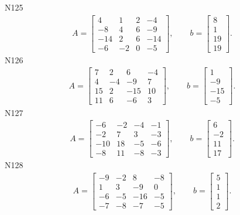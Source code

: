 \documentclass[11pt]{report}
\begin{document}
N125
\begin{align*}
 A = \left[\begin{matrix}4 & 1 & 2 & -4\\-8 & 4 & 6 & -9\\-14 & 2 & 6 & -14\\-6 & -2 & 0 & -5\end{matrix}\right],
\qquad b = \left[\begin{matrix}8\\1\\19\\19\end{matrix}\right]. 
 \end{align*}
N126
\begin{align*}
 A = \left[\begin{matrix}7 & 2 & 6 & -4\\4 & -4 & -9 & 7\\15 & 2 & -15 & 10\\11 & 6 & -6 & 3\end{matrix}\right],
\qquad b = \left[\begin{matrix}1\\-9\\-15\\-5\end{matrix}\right]. 
 \end{align*}
N127
\begin{align*}
 A = \left[\begin{matrix}-6 & -2 & -4 & -1\\-2 & 7 & 3 & -3\\-10 & 18 & -5 & -6\\-8 & 11 & -8 & -3\end{matrix}\right],
\qquad b = \left[\begin{matrix}6\\-2\\11\\17\end{matrix}\right]. 
 \end{align*}
N128
\begin{align*}
 A = \left[\begin{matrix}-9 & -2 & 8 & -8\\1 & 3 & -9 & 0\\-6 & -5 & -16 & -5\\-7 & -8 & -7 & -5\end{matrix}\right],
\qquad b = \left[\begin{matrix}5\\1\\1\\2\end{matrix}\right]. 
 \end{align*}
\end{document}
